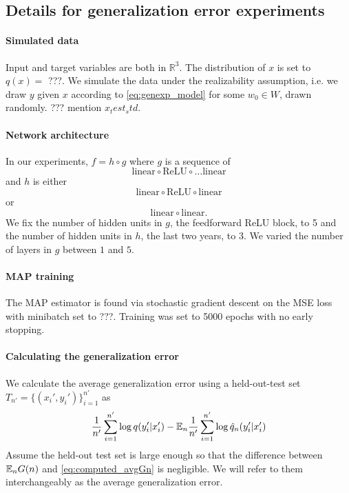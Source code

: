 \documentclass{article} %
\begin{document}
\subsection{Details for generalization error experiments}
\label{appendix:generalizaton}

\paragraph{Simulated data}
Input and target variables are both in $\mathbb R^3$. The distribution of $x$ is set to $q(x)=$ ???. We simulate the data under the realizability assumption, i.e. we draw $y$ given $x$ according to \eqref{eq:genexp_model} for some $w_0 \in W$, drawn randomly. ??? mention $x_test_std$.

\paragraph{Network architecture} In our experiments, $f = h \circ g$ where $g$ is a sequence of 
\[
\text{linear} \circ \text{ReLU} \circ \ldots \text{linear}
\]
and $h$ is either
\begin{equation}
    \text{linear} \circ \text{ReLU} \circ \text{linear} 
\end{equation}
or
\begin{equation}
    \text{linear}  \circ \text{linear}. 
\end{equation}
We fix the number of hidden units in $g$, the feedforward ReLU block, to 5 and the number of hidden units in $h$, the last two years, to 3. We varied the number of layers in $g$ between $1$ and $5$.

\paragraph{MAP training}
The MAP estimator is found via stochastic gradient descent on the MSE loss with minibatch set to ???. Training was set to 5000 epochs with no early stopping. 

\paragraph{Calculating the generalization error}
We calculate the average generalization error using a held-out-test set $T_{n'} = \{(x_i',y_i')\}_{i=1}^{n'}$ as
\begin{equation}
\frac{1}{n'} \sum_{i=1}^{n'} \log q(y_i'|x_i') - {\mathbb{E}}_n \frac{1}{n'} \sum_{i=1}^{n'} \log \hat q_n(y_i'|x_i')
\label{eq:computed_avgGn}
\end{equation}
Assume the held-out test set is large enough so that the difference between ${\mathbb{E}}_n G(n)$ and \eqref{eq:computed_avgGn} is negligible. We will refer to them interchangeably as the average generalization error. 
\end{document}
